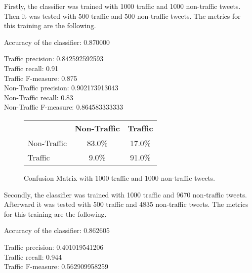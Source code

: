 Firstly, the classifier was trained with 1000 traffic and 1000 non-traffic tweets. Then it was tested with 500 traffic and 500 non-traffic tweets. The metrics for this training are the following. 

Accuracy of the classifier:   0.870000

Traffic precision:\hspace{15.5 mm}              0.842592592593\\
Traffic recall:\hspace{21.2 mm}                             0.91\\
Traffic F-measure:\hspace{12.8 mm}             0.875\\

Non-Traffic precision:\hspace{7.2 mm}        0.902173913043\\
Non-Traffic recall:\hspace{13 mm}            0.83\\
Non-Traffic F-measure:\hspace{4.6 mm}       0.864583333333\\

\begin{figure}[h!]
\begin{center}
    \begin{tabular}{| l || c | c | }
    \hline
          & Non-Traffic & Traffic \\ \hline \hline
         Non-Traffic & 83.0\% & 17.0\% \\ \hline
         Traffic & 9.0\% & 91.0\% \\ \hline
    \end{tabular}
    \caption{Confusion Matrix with 1000 traffic and 1000 non-traffic tweets.}
    \label{fig:confusionMatrix1}
\end{center}
\end{figure}	

Secondly, the classifier was trained with 1000 traffic and 9670 non-traffic tweets. Afterward it was tested with 500 traffic and 4835 non-traffic tweets. The metrics for this training are the following. 

Accuracy of the classifier:   0.862605

Traffic precision:\hspace{15.5 mm}            0.401019541206\\
Traffic recall:\hspace{21.2 mm}               0.944\\
Traffic F-measure:\hspace{12.8 mm}         0.562909958259\\

